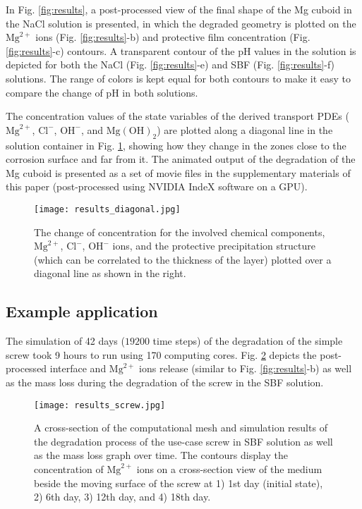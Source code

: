 In Fig. \ref{fig:results}, a post-processed view of the final shape of the Mg cuboid in the NaCl solution is presented, in which the degraded geometry is plotted on the $\mathrm{Mg}^{2+}$ ions (Fig. \ref{fig:results}-b) and protective film concentration (Fig. \ref{fig:results}-c) contours. A transparent contour of the pH values in the solution is depicted for both the NaCl (Fig. \ref{fig:results}-e) and SBF (Fig. \ref{fig:results}-f) solutions. The range of colors is kept equal for both contours to make it easy to compare the change of pH in both solutions.

The concentration values of the state variables of the derived transport PDEs ($\mathrm{Mg}^{2+}$, $\mathrm{Cl}^{-}$, $\mathrm{OH}^{-}$, and $\mathrm{Mg(OH)}_2$) are plotted along a diagonal line in the solution container in Fig. \ref{fig:results_diagonal}, showing how they change in the zones close to the corrosion surface and far from it. The animated output of the degradation of the Mg cuboid is presented as a set of movie files in the supplementary materials of this paper (post-processed using NVIDIA IndeX software on a GPU).


\begin{figure}[t]
\centering
\medskip
\texttt{[image: results\_diagonal.jpg]}
\caption[Change of concentration of various chemical components over a line]{The change of concentration for the involved chemical components, $\mathrm{Mg}^{2+}$, $\mathrm{Cl}^{-}$, $\mathrm{OH}^{-}$ ions, and the protective precipitation structure (which can be correlated to the thickness of the layer) plotted over a diagonal line as shown in the right.} \label{fig:results_diagonal}
\end{figure}

\subsection{Example application}

The simulation of 42 days ($\num{19200}$ time steps) of the degradation of the simple screw took 9 hours to run using 170 computing cores. Fig. \ref{fig:results_screw} depicts the post-processed interface and $\mathrm{Mg}^{2+}$ ions release (similar to Fig. \ref{fig:results}-b) as well as the mass loss during the degradation of the screw in the SBF solution.

\begin{figure}[t]
\centering
\medskip
\texttt{[image: results\_screw.jpg]}
\caption[Simulation results of the sample screw in the biodegradation test]{A cross-section of the computational mesh and simulation results of the degradation process of the use-case screw in SBF solution as well as the mass loss graph over time. The contours display the concentration of $\mathrm{Mg}^{2+}$ ions on a cross-section view of the medium beside the moving surface of the screw at 1) 1st day (initial state), 2) 6th day, 3) 12th day, and 4) 18th day.} \label{fig:results_screw}
\end{figure}



